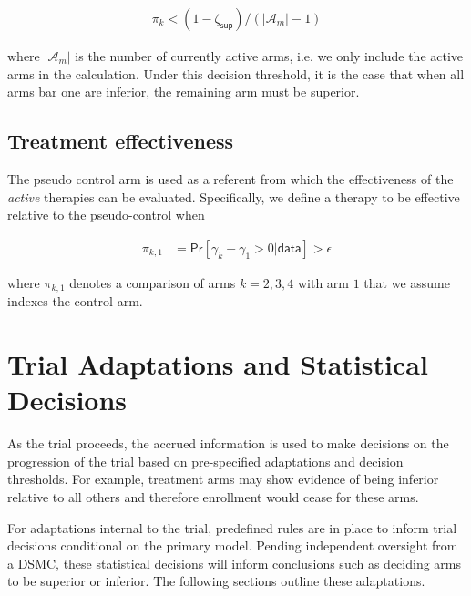 \documentclass[
]{article}
\begin{document}
\[
  \begin{aligned}
    \pi_{k} < (1 - \zeta_{\mathsf{sup}}) / (|\mathcal{A}_m| - 1)
  \end{aligned}
\]

where $|\mathcal{A}_m|$ is the number of currently active arms, i.e. we only include the active arms in the calculation.
Under this decision threshold, it is the case that when all arms bar one are inferior, the remaining arm must be superior.

\hypertarget{treatment-effectiveness}{%
  \subsection{Treatment effectiveness}\label{treatment-effectiveness}}

The pseudo control arm is used as a referent from which the effectiveness of the \textit{active} therapies can be evaluated.
Specifically, we define a therapy to be effective relative to the pseudo-control when

\[
  \begin{aligned}
    \pi_{k,1} & = \mathsf{Pr}[\gamma_{k} - \gamma_{1} >0|\mathsf{data}] > \epsilon
  \end{aligned}
\]

where $\pi_{k,1}$ denotes a comparison of arms $k = 2, 3, 4$ with arm $1$ that we assume indexes the control arm.

\clearpage

\hypertarget{trial-adaptations-and-statistical-decisions}{%
  \section{Trial Adaptations and Statistical Decisions}\label{trial-adaptations-and-statistical-decisions}}

As the trial proceeds, the accrued information is used to make decisions on the progression of the trial based on pre-specified adaptations and decision thresholds.
For example, treatment arms may show evidence of being inferior relative to all others and therefore enrollment would cease for these arms.

For adaptations internal to the trial, predefined rules are in place to inform trial decisions conditional on the primary model.
Pending independent oversight from a DSMC, these statistical decisions will inform conclusions such as deciding arms to be superior or inferior.
The following sections outline these adaptations.
\end{document}
